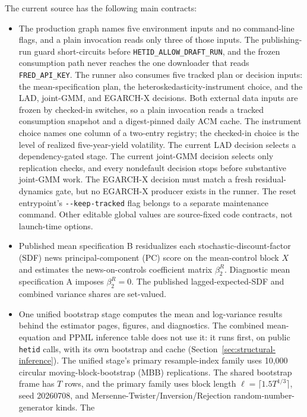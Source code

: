 \documentclass[11pt]{article}
\DeclareRobustCommand{\code}[1]{%
  \ifmmode\text{\ttfamily\detokenize{#1}}\else\nolinkurl{#1}\fi}
\begin{document}
The current source has the following main contracts:
\begin{itemize}
  \item The production graph names five environment inputs and no command-line
    flags, and a plain invocation reads only three of those inputs. The publishing-run guard
    short-circuits before \code{HETID_ALLOW_DRAFT_RUN}, and the frozen consumption
    path never reaches the one downloader that reads \code{FRED_API_KEY}. The runner
    also consumes five tracked plan or decision inputs: the mean-specification
    plan, the heteroskedasticity-instrument choice, and the LAD, joint-GMM, and
    EGARCH-X decisions. Both external data inputs
    are frozen by checked-in switches, so a plain invocation reads a tracked
    consumption snapshot and a digest-pinned daily ACM cache. The instrument
    choice names one column of a two-entry registry; the checked-in choice is the
    level of realized five-year-yield volatility. The current LAD decision
    selects a dependency-gated stage. The current joint-GMM decision selects only
    replication checks, and every nondefault decision stops before substantive
    joint-GMM work. The EGARCH-X decision must match a fresh residual-dynamics gate, but no
    EGARCH-X producer exists in the runner. The reset entrypoint's
    \code{--keep-tracked} flag belongs to a separate maintenance command. Other
    editable global values are source-fixed code contracts, not launch-time
    options.
  \item Published mean specification B residualizes each
    stochastic-discount-factor (SDF) news principal-component (PC) score on
    the mean-control block $X$ and estimates the news-on-controls coefficient
    matrix $\beta_2^R$. Diagnostic mean specification A imposes
    $\beta_2^R=0$. The published lagged-expected-SDF and combined variance shares are
    set-valued.
  \item One unified bootstrap stage computes the mean and log-variance
    results behind the estimator pages, figures, and diagnostics. The combined
    mean-equation and PPML inference table does not use it: it runs first, on
    public \code{hetid} calls, with its own bootstrap and cache
    (Section~\ref{sec:structural-inference}). The unified stage's primary resample-index family uses 10,000 circular
    moving-block-bootstrap (MBB) replications. The shared bootstrap frame has
    $T$ rows, and the primary family uses block length
    $\ell=\lceil1.5T^{1/3}\rceil$, seed 20260708, and
    Mersenne-Twister/Inversion/Rejection random-number-generator kinds. The

\end{itemize}
\end{document}
